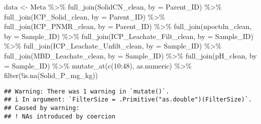 \documentclass[
]{article}
\newenvironment{Shaded}{\begin{snugshade}}{\end{snugshade}}
\newcommand{\AttributeTok}[1]{\textcolor[rgb]{0.77,0.63,0.00}{#1}}
\newcommand{\DecValTok}[1]{\textcolor[rgb]{0.00,0.00,0.81}{#1}}
\newcommand{\FunctionTok}[1]{\textcolor[rgb]{0.00,0.00,0.00}{#1}}
\newcommand{\NormalTok}[1]{#1}
\newcommand{\OtherTok}[1]{\textcolor[rgb]{0.56,0.35,0.01}{#1}}
\newcommand{\SpecialCharTok}[1]{\textcolor[rgb]{0.00,0.00,0.00}{#1}}
\newcommand{\StringTok}[1]{\textcolor[rgb]{0.31,0.60,0.02}{#1}}
\begin{document}
\begin{Shaded}
\begin{Highlighting}[]
\NormalTok{data }\OtherTok{\textless{}{-}}\NormalTok{ Meta }\SpecialCharTok{\%\textgreater{}\%}
  \FunctionTok{full\_join}\NormalTok{(SolidCN\_clean, }\AttributeTok{by =} \StringTok{\textquotesingle{}Parent\_ID\textquotesingle{}}\NormalTok{) }\SpecialCharTok{\%\textgreater{}\%}
  \FunctionTok{full\_join}\NormalTok{(ICP\_Solid\_clean, }\AttributeTok{by =} \StringTok{\textquotesingle{}Parent\_ID\textquotesingle{}}\NormalTok{) }\SpecialCharTok{\%\textgreater{}\%}
  \FunctionTok{full\_join}\NormalTok{(ICP\_PNMR\_clean, }\AttributeTok{by =} \StringTok{\textquotesingle{}Parent\_ID\textquotesingle{}}\NormalTok{) }\SpecialCharTok{\%\textgreater{}\%}
  \FunctionTok{full\_join}\NormalTok{(npoctdn\_clean, }\AttributeTok{by =} \StringTok{\textquotesingle{}Sample\_ID\textquotesingle{}}\NormalTok{) }\SpecialCharTok{\%\textgreater{}\%}
  \FunctionTok{full\_join}\NormalTok{(ICP\_Leachate\_Filt\_clean, }\AttributeTok{by =} \StringTok{\textquotesingle{}Sample\_ID\textquotesingle{}}\NormalTok{) }\SpecialCharTok{\%\textgreater{}\%}
  \FunctionTok{full\_join}\NormalTok{(ICP\_Leachate\_Unfilt\_clean, }\AttributeTok{by =} \StringTok{\textquotesingle{}Sample\_ID\textquotesingle{}}\NormalTok{) }\SpecialCharTok{\%\textgreater{}\%}
  \FunctionTok{full\_join}\NormalTok{(MBD\_Leachate\_clean, }\AttributeTok{by =} \StringTok{\textquotesingle{}Sample\_ID\textquotesingle{}}\NormalTok{) }\SpecialCharTok{\%\textgreater{}\%}
  \FunctionTok{full\_join}\NormalTok{(pH\_clean, }\AttributeTok{by =} \StringTok{\textquotesingle{}Sample\_ID\textquotesingle{}}\NormalTok{) }\SpecialCharTok{\%\textgreater{}\%}
  \FunctionTok{mutate\_at}\NormalTok{(}\FunctionTok{c}\NormalTok{(}\DecValTok{10}\SpecialCharTok{:}\DecValTok{48}\NormalTok{), as.numeric) }\SpecialCharTok{\%\textgreater{}\%}
  \FunctionTok{filter}\NormalTok{(}\SpecialCharTok{!}\FunctionTok{is.na}\NormalTok{(Solid\_P\_mg\_kg))}
\end{Highlighting}
\end{Shaded}

\begin{verbatim}
## Warning: There was 1 warning in `mutate()`.
## i In argument: `FilterSize = .Primitive("as.double")(FilterSize)`.
## Caused by warning:
## ! NAs introduced by coercion
\end{verbatim}
\end{document}
